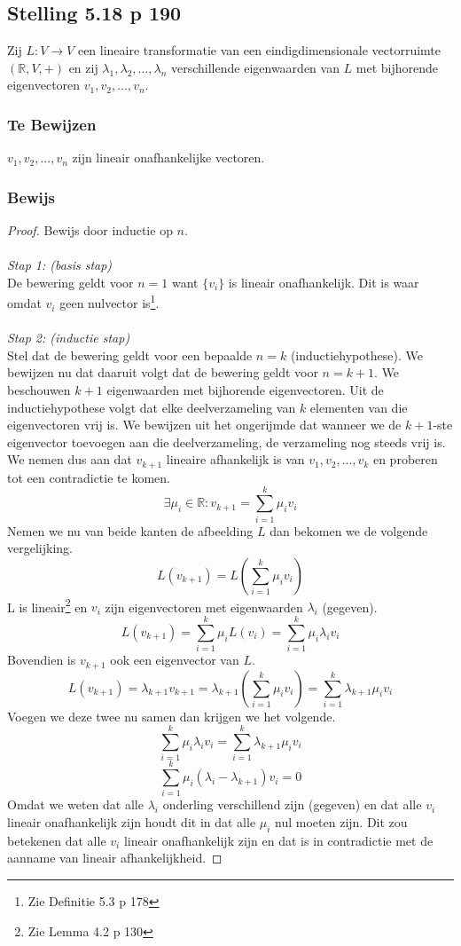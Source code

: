 \documentclass[lineaire_algebra_oplossingen.tex]{subfiles}
\begin{document}
\subsection{Stelling 5.18 p 190}
Zij $L:V\rightarrow V$ een lineaire transformatie van een eindigdimensionale vectorruimte $(\mathbb{R},V,+)$ en zij $\lambda_1,\lambda_2,...,\lambda_n$ verschillende eigenwaarden van $L$ met bijhorende eigenvectoren $v_1,v_2,...,v_n$.
\subsubsection*{Te Bewijzen}
$v_1,v_2,...,v_n$ zijn lineair onafhankelijke vectoren.
\subsubsection*{Bewijs}
\begin{proof}
Bewijs door inductie op $n$.\\\\
\emph{Stap 1: (basis stap)}\\
De bewering geldt voor $n=1$ want $\{v_i\}$ is lineair onafhankelijk. Dit is waar omdat $v_i$ geen nulvector is\footnote{Zie Definitie 5.3 p 178}.\\\\
\emph{Stap 2: (inductie stap)}\\
Stel dat de bewering geldt voor een bepaalde $n=k$ (inductiehypothese). We bewijzen nu dat daaruit volgt dat de bewering geldt voor $n=k+1$.
We beschouwen $k+1$ eigenwaarden met bijhorende eigenvectoren. Uit de inductiehypothese volgt dat elke deelverzameling van $k$ elementen van die eigenvectoren vrij is.
We bewijzen uit het ongerijmde dat wanneer we de $k+1$-ste eigenvector toevoegen aan die deelverzameling, de verzameling nog steeds vrij is.
We nemen dus aan dat $v_{k+1}$ lineaire afhankelijk is van $v_1,v_2,...,v_k$ en proberen tot een contradictie te komen.
\[
\exists \mu_i\in\mathbb{R} : v_{k+1} = \sum_{i=1}^k\mu_iv_i
\]
Nemen we nu van beide kanten de afbeelding $L$ dan bekomen we de volgende vergelijking.
\[
L( v_{k+1}) = L\left(\sum_{i=1}^k\mu_iv_i\right)
\]
L is lineair\footnote{Zie Lemma 4.2 p 130} en $v_i$ zijn eigenvectoren met eigenwaarden $\lambda_i$ (gegeven).
\[
L(v_{k+1}) = \sum_{i=1}^k\mu_iL(v_i) = \sum_{i=1}^k\mu_i\lambda_iv_i
\]
Bovendien is $v_{k+1}$ ook een eigenvector van $L$.
\[
L(v_{k+1}) = \lambda_{k+1}v_{k+1} = \lambda_{k+1}\left(\sum_{i=1}^k\mu_iv_i\right) = \sum_{i=1}^k\lambda_{k+1}\mu_iv_i
\]
Voegen we deze twee nu samen dan krijgen we het volgende.
\[
\sum_{i=1}^k\mu_i\lambda_iv_i = \sum_{i=1}^k\lambda_{k+1}\mu_iv_i
\]
\[
\sum_{i=1}^k \mu_i(\lambda_i-\lambda_{k+1})v_i = 0
\]
Omdat we weten dat alle $\lambda_i$ onderling verschillend zijn (gegeven) en dat alle $v_i$ lineair onafhankelijk zijn houdt dit in dat alle $\mu_i$ nul moeten zijn. Dit zou betekenen dat alle $v_i$ lineair onafhankelijk zijn en dat is in contradictie met de aanname van lineair afhankelijkheid.
\end{proof}
\end{document}
